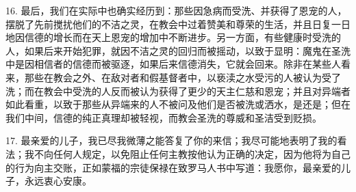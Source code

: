 16. 最后，我们在实际中也确实经历到：那些因急病而受洗、并获得了恩宠的人，摆脱了先前搅扰他们的不洁之灵，在教会中过着赞美和尊荣的生活，并且日复一日地因信德的增长而在天上恩宠的增加中不断进步。另一方面，有些健康时受洗的人，如果后来开始犯罪，就因不洁之灵的回归而被摇动，以致于显明：魔鬼在圣洗中是因相信者的信德而被驱逐，如果后来信德消失，它就会回来。除非在某些人看来，那些在教会之外、在敌对者和假基督者中，以亵渎之水受污的人被认为受了洗；而在教会中受洗的人反而被认为获得了更少的天主仁慈和恩宠；并且对异端者如此看重，以致于那些从异端来的人不被问及他们是否被洗或洒水，是还是；但在我们中间，信德的纯正真理却被轻视，而教会圣洗的尊威和圣洁受到贬损。\par

17. 最亲爱的儿子，我已尽我微薄之能答复了你的来信；我尽可能地表明了我的看法；我不向任何人规定，以免阻止任何主教按他认为正确的决定，因为他将为自己的行为向主交账，正如蒙福的宗徒保禄在致罗马人书中写道：我愿你，最亲爱的儿子，永远衷心安康。\par



\section{}

\par

\par

